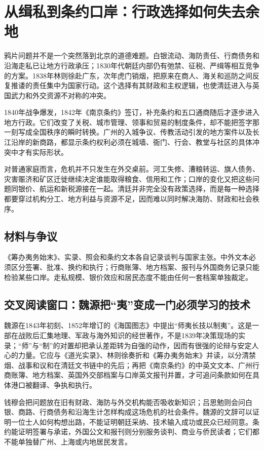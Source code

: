 \section{从缉私到条约口岸：行政选择如何失去余地}

鸦片问题并不是一个突然落到北京的道德难题。白银流动、海防责任、行商债务和沿海走私已让地方行政承压；1830年代朝廷内部仍有弛禁、征税、严缉等相互竞争的方案。1838年林则徐赴广东，次年虎门销烟，把原来在商人、海关和巡防之间反复推诿的责任集中为国家行动。这个选择有其财政和主权逻辑，也使清廷进入与英国武力和外交资源不对称的冲突。

1840年战争爆发，1842年《南京条约》签订，补充条约和五口通商随后才逐步进入地方行政。它们改变了关税、城市管理、领事和贸易的制度条件，却不能把签字那一刻写成全国秩序的瞬时转换。广州的入城争议、传教活动引发的地方案件以及长江沿岸的新商路，都显示条约权利必须在城墙、衙门、行会、教堂与社区的具体冲突中才有实际形状。

对普通家庭而言，危机并不只发生在外交桌前。河工失修、漕粮转运、旗人债务、灾害赈济和矿区迁徙继续决定谁能取得粮食、信用和工作；口岸的变化又把这些问题同银价、航运和新税源接在一起。清廷并非完全没有政策选择，而是每一种选择都要穿过机构分工、地方利益与资源不足，因而难以同时解决海防、财政和社会秩序。

\subsection{材料与争议}

《筹办夷务始末》、实录、照会和条约文本各自记录谈判与国家主张。中外文本必须区分签署、批准、换约和执行；行商账簿、地方档案、报刊与外国商务记录只能检验某些口岸。走私规模、银价效应和居民态度不能由任何一套档案单独裁定。

\subsection{交叉阅读窗口：魏源把“夷”变成一门必须学习的技术}

魏源在1843年初刻、1852年增订的《海国图志》中提出“师夷长技以制夷”。这是一部在战败后汇集地理、军政与海外知识的经世著作，不是1839年决策现场的实录；“师”与“制”的对置却把承认差距转为自强的动作，因而有很强的论辩与安定人心的力量。它应与《道光实录》、林则徐奏折和《筹办夷务始末》并读，以分清禁烟、战事和议和在清廷文书链中的先后；再把《南京条约》的中英文文本、广州行商账簿、地方档案、英国外交部档案与口岸英文报刊并置，才可追问条款如何在具体港口被翻译、争执和执行。

钱穆会把问题放在旧有财政、海防与外交机构能否吸收新知识；吕思勉则会问白银、商路、行商债务和沿海生计怎样构成这场危机的社会条件。魏源的文辞可以证明一位士人如何构想出路，不能证明朝廷采纳、技术输入成功或民众已经同意。条约能证明签署与承诺，外国公文和报刊则分别服务谈判、商业与侨民读者；它们都不能单独替广州、上海或内地居民发言。
